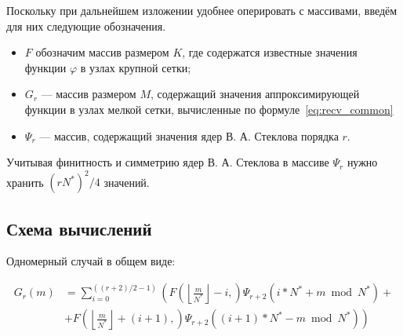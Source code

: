 Поскольку при дальнейшем изложении удобнее оперировать с 
массивами, введём для них следующие обозначения.
\begin{itemize}

\item
  $F$ обозначим массив размером $K$,
  где содержатся известные значения функции $\varphi$
  в узлах крупной сетки;

\item
  $G_r$ --- массив размером  $M$,
  содержащий 
  значения аппроксимирующей функции в узлах мелкой сетки,
  вычисленные по формуле~\eqref{eq:recv_common}
%

\item
  $\Psi_{r}$ --- массив, содержащий значения ядер В. А. Стеклова порядка $r$.
%

\end{itemize}

Учитывая финитность и симметрию ядер В. А. Стеклова
в массиве $\Psi_{r}$ нужно хранить $(rN^*)^2/4$
значений.





\subsection*{Схема вычислений}



Одномерный случай в общем виде:

\begin{equation}
  \label{eq:recv_r0}
  \begin{split}
  G_r(m) &= 
  \sum_{i = 0}^{((r+2)/2 -1)}
  \left(
    F \left( \left \lfloor \frac{m}{N^*} \right \rfloor - i,
      \right)
    \Psi_{r+2}(i*N^* + m\bmod N^*) +{} \right.\\
        & \left. + F \left(
                \left \lfloor \frac{m}{N^*} \right \rfloor + (i+1),
              \right)
            \Psi_{r+2}((i+1)*N^* - m \bmod N^*)
  \right)
  \end{split}
\end{equation}


